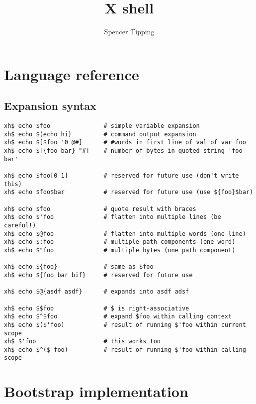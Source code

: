 \documentclass{report}
\title{X shell}
\author{Spencer Tipping}
\begin{document}
\maketitle{}
\tableofcontents{}


\part{Language reference}\label{part:language-reference}
\chapter{Expansion syntax}\label{chp:expansion-syntax}
\begin{verbatim}
xh$ echo $foo               # simple variable expansion
xh$ echo $(echo hi)         # command output expansion
xh$ echo $[$foo '0 @#]      # #words in first line of val of var foo
xh$ echo $[{foo bar} "#]    # number of bytes in quoted string 'foo bar'

xh$ echo $foo[0 1]          # reserved for future use (don't write this)
xh$ echo $foo$bar           # reserved for future use (use ${foo}$bar)

xh$ echo $foo               # quote result with braces
xh$ echo $'foo              # flatten into multiple lines (be careful!)
xh$ echo $@foo              # flatten into multiple words (one line)
xh$ echo $:foo              # multiple path components (one word)
xh$ echo $"foo              # multiple bytes (one path component)

xh$ echo ${foo}             # same as $foo
xh$ echo ${foo bar bif}     # reserved for future use

xh$ echo $@{asdf asdf}      # expands into asdf adsf

xh$ echo $$foo              # $ is right-associative
xh$ echo $^$foo             # expand $foo within calling context
xh$ echo $($'foo)           # result of running $'foo within current scope
xh$ $'foo                   # this works too
xh$ echo $^($'foo)          # result of running $'foo within calling scope
\end{verbatim}

\part{Bootstrap implementation}\label{part:bootstrap-implementation}
\end{document}
